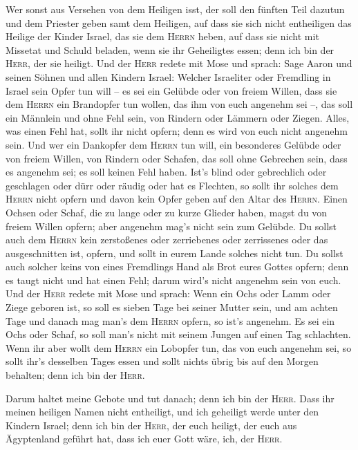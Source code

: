  Wer sonst aus Versehen von dem Heiligen isst, der soll
den fünften Teil dazutun und dem Priester geben samt dem Heiligen,
 auf dass sie sich nicht entheiligen das Heilige der
Kinder Israel, das sie dem \textsc{Herrn} heben,  auf
dass sie nicht mit Missetat und Schuld beladen, wenn sie ihr Geheiligtes
essen; denn ich bin der \textsc{Herr}, der sie heiligt. 
Und der \textsc{Herr} redete mit Mose und sprach:  Sage
Aaron und seinen Söhnen und allen Kindern Israel: Welcher Israeliter
oder Fremdling in Israel sein Opfer tun will -- es sei ein Gelübde oder
von freiem Willen, dass sie dem \textsc{Herrn} ein Brandopfer tun
wollen, das ihm von euch angenehm sei --,  das soll ein
Männlein und ohne Fehl sein, von Rindern oder Lämmern oder Ziegen.
 Alles, was einen Fehl hat, sollt ihr nicht opfern; denn
es wird von euch nicht angenehm sein.  Und wer ein
Dankopfer dem \textsc{Herrn} tun will, ein besonderes Gelübde oder von
freiem Willen, von Rindern oder Schafen, das soll ohne Gebrechen sein,
dass es angenehm sei; es soll keinen Fehl haben.  Ist's
blind oder gebrechlich oder geschlagen oder dürr oder räudig oder hat es
Flechten, so sollt ihr solches dem \textsc{Herrn} nicht opfern und davon
kein Opfer geben auf den Altar des \textsc{Herrn}.  Einen
Ochsen oder Schaf, die zu lange oder zu kurze Glieder haben, magst du
von freiem Willen opfern; aber angenehm mag's nicht sein zum Gelübde.
 Du sollst auch dem \textsc{Herrn} kein zerstoßenes oder
zerriebenes oder zerrissenes oder das ausgeschnitten ist, opfern, und
sollt in eurem Lande solches nicht tun.  Du sollst auch
solcher keins von eines Fremdlings Hand als Brot eures Gottes opfern;
denn es taugt nicht und hat einen Fehl; darum wird's nicht angenehm sein
von euch.  Und der \textsc{Herr} redete mit Mose und
sprach:  Wenn ein Ochs oder Lamm oder Ziege geboren ist,
so soll es sieben Tage bei seiner Mutter sein, und am achten Tage und
danach mag man's dem \textsc{Herrn} opfern, so ist's angenehm.
 Es sei ein Ochs oder Schaf, so soll man's nicht mit
seinem Jungen auf einen Tag schlachten.  Wenn ihr aber
wollt dem \textsc{Herrn} ein Lobopfer tun, das von euch angenehm sei,
 so sollt ihr's desselben Tages essen und sollt nichts
übrig bis auf den Morgen behalten; denn ich bin der \textsc{Herr}.

 Darum haltet meine Gebote und tut danach; denn ich bin
der \textsc{Herr}.  Dass ihr meinen heiligen Namen nicht
entheiligt, und ich geheiligt werde unter den Kindern Israel; denn ich
bin der \textsc{Herr}, der euch heiligt,  der euch aus
Ägyptenland geführt hat, dass ich euer Gott wäre, ich, der
\textsc{Herr}.

